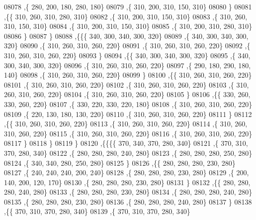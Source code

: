 \begin{DoxyCode}
08078     ,\{   280,   200,   180,   280,   180\}
08079     ,\{   310,   200,   310,   150,   310\}
08080     \}
08081    ,\{\{   310,   260,   310,   280,   310\}
08082     ,\{   310,   200,   310,   150,   310\}
08083     ,\{   310,   260,   310,   150,   310\}
08084     ,\{   310,   200,   310,   150,   310\}
08085     ,\{   310,   200,   310,   280,   310\}
08086     \}
08087    \}
08088   ,\{\{\{   340,   300,   340,   300,   320\}
08089     ,\{   340,   300,   340,   300,   320\}
08090     ,\{   310,   260,   310,   260,   220\}
08091     ,\{   310,   260,   310,   260,   220\}
08092     ,\{   310,   260,   310,   260,   220\}
08093     \}
08094    ,\{\{   340,   300,   340,   300,   320\}
08095     ,\{   340,   300,   340,   300,   320\}
08096     ,\{   310,   260,   310,   260,   220\}
08097     ,\{   290,   180,   290,   180,   140\}
08098     ,\{   310,   260,   310,   260,   220\}
08099     \}
08100    ,\{\{   310,   260,   310,   260,   220\}
08101     ,\{   310,   260,   310,   260,   220\}
08102     ,\{   310,   260,   310,   260,   220\}
08103     ,\{   310,   260,   310,   260,   220\}
08104     ,\{   310,   260,   310,   260,   220\}
08105     \}
08106    ,\{\{   330,   260,   330,   260,   220\}
08107     ,\{   330,   220,   330,   220,   180\}
08108     ,\{   310,   260,   310,   260,   220\}
08109     ,\{   220,   130,   180,   130,   220\}
08110     ,\{   310,   260,   310,   260,   220\}
08111     \}
08112    ,\{\{   310,   260,   310,   260,   220\}
08113     ,\{   310,   260,   310,   260,   220\}
08114     ,\{   310,   260,   310,   260,   220\}
08115     ,\{   310,   260,   310,   260,   220\}
08116     ,\{   310,   260,   310,   260,   220\}
08117     \}
08118    \}
08119   \}
08120  ,\{\{\{\{   370,   340,   370,   280,   340\}
08121     ,\{   370,   310,   370,   280,   340\}
08122     ,\{   280,   280,   280,   240,   280\}
08123     ,\{   280,   280,   280,   250,   280\}
08124     ,\{   340,   340,   280,   250,   280\}
08125     \}
08126    ,\{\{   280,   280,   280,   230,   280\}
08127     ,\{   240,   240,   240,   200,   240\}
08128     ,\{   280,   280,   280,   230,   280\}
08129     ,\{   200,   140,   200,   120,   170\}
08130     ,\{   280,   280,   280,   230,   280\}
08131     \}
08132    ,\{\{   280,   280,   280,   240,   280\}
08133     ,\{   280,   280,   280,   230,   280\}
08134     ,\{   280,   280,   280,   240,   280\}
08135     ,\{   280,   280,   280,   230,   280\}
08136     ,\{   280,   280,   280,   240,   280\}
08137     \}
08138    ,\{\{   370,   310,   370,   280,   340\}
08139     ,\{   370,   310,   370,   280,   340\}

\end{DoxyCode}
